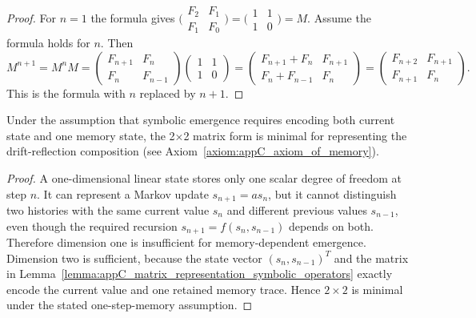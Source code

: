 \begin{proof}
\label{proof:appC_fibonacci_matrix_powers}
For $n=1$ the formula gives
$\bigl(\begin{smallmatrix}F_2&F_1\\F_1&F_0\end{smallmatrix}\bigr)
=\bigl(\begin{smallmatrix}1&1\\1&0\end{smallmatrix}\bigr)=M$. Assume the formula
holds for $n$. Then
\[
M^{n+1}=M^nM
=\begin{pmatrix}F_{n+1}&F_n\\F_n&F_{n-1}\end{pmatrix}
 \begin{pmatrix}1&1\\1&0\end{pmatrix}
=\begin{pmatrix}F_{n+1}+F_n&F_{n+1}\\F_n+F_{n-1}&F_n\end{pmatrix}
=\begin{pmatrix}F_{n+2}&F_{n+1}\\F_{n+1}&F_n\end{pmatrix}.
\]
This is the formula with $n$ replaced by $n+1$.
\end{proof}

\begin{proposition}
\label{proposition:appC_conditional_minimality_2x2}
Under the assumption that symbolic emergence requires encoding both current state
and one memory state, the 2×2 matrix form is minimal for representing the
drift-reflection composition (see Axiom~\ref{axiom:appC_axiom_of_memory}).
\end{proposition}

\begin{proof}
\label{proof:appC_conditional_minimality_2x2}
A one-dimensional linear state stores only one scalar degree of freedom at step
$n$. It can represent a Markov update $s_{n+1}=a s_n$, but it cannot distinguish
two histories with the same current value $s_n$ and different previous values
$s_{n-1}$, even though the required recursion
$s_{n+1}=f(s_n,s_{n-1})$ depends on both. Therefore dimension one is insufficient
for memory-dependent emergence. Dimension two is sufficient, because the state
vector $(s_n,s_{n-1})^T$ and the matrix in
Lemma~\ref{lemma:appC_matrix_representation_symbolic_operators} exactly encode the
current value and one retained memory trace. Hence $2\times2$ is minimal under the
stated one-step-memory assumption.
\end{proof}

